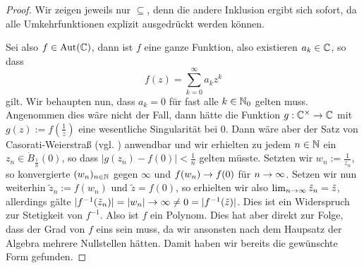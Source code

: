 \begin{proof}
  Wir zeigen jeweils nur $\subseteq$, denn die andere Inklusion ergibt
  sich sofort, da alle Umkehrfunktionen explizit ausgedrückt werden
  können.

  Sei also $f \in \operatorname{Aut}(\mathbb{C})$, dann ist $f$ eine ganze Funktion, also
  existieren $a_k \in \mathbb{C}$, so dass
  \[
  f(z) = \sum_{k=0}^\infty a_k z^k
  \]
  gilt. Wir behaupten nun, dass $a_k = 0$ für fast alle $k \in \mathbb{N}_0$
  gelten muss. Angenommen dies wäre nicht der Fall, dann hätte die
  Funktion $g: \mathbb{C}^\times \rightarrow \mathbb{C}$ mit $g(z) := f(\frac{1}{z})$ eine
  wesentliche Singularität bei $0$. Dann wäre aber der Satz von
  Casorati-Weierstraß (vgl. \cite[Satz 6.11]{Kas}) anwendbar und wir
  erhielten zu jedem $n \in \mathbb{N}$
  ein $z_n \in \dot B_{\frac{1}{n}}(0)$, so dass $|g(z_n) - f(0)| <
  \frac{1}{n}$ gelten müsste. Setzten wir $w_n := \frac{1}{z_n}$, so konvergierte
  $(w_n)_{n \in \mathbb{N}}$ gegen $\infty$ und $f(w_n) \rightarrow f(0)$ für $n \rightarrow
  \infty$. Setzen wir nun weiterhin $\tilde z_n := f(w_n)$ und $\tilde
  z = f(0)$, so erhielten wir also $\lim_{n \rightarrow \infty} \tilde z_n =
  \tilde z$, allerdings gälte $|f^{-1}(\tilde z_n)| = |w_n| \rightarrow \infty
  \neq 0 = |f^{-1}(\tilde z)|$. Dies ist ein Widerspruch zur
  Stetigkeit von $f^{-1}$. Also ist $f$ ein Polynom. Dies hat aber
  direkt zur Folge, dass der Grad von $f$ eins sein muss, da wir
  ansonsten nach dem Haupsatz der Algebra mehrere Nullstellen
  hätten. Damit haben wir bereits die gewünschte Form gefunden.


\end{proof}
